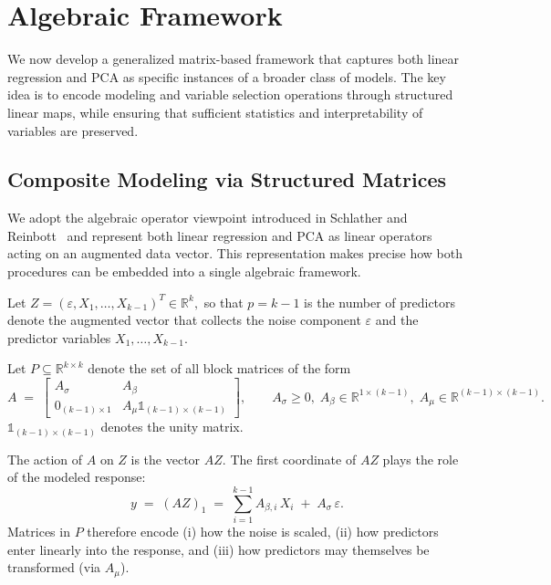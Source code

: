 \section{Algebraic Framework}


We now develop a generalized matrix-based framework that captures both linear regression and PCA as specific instances of a broader class of models. The key idea is to encode modeling and variable selection operations through structured linear maps, while ensuring that sufficient statistics and interpretability of variables are preserved.

\subsection{Composite Modeling via Structured Matrices}
\label{subsec:operator-formulation} 

We adopt the algebraic operator viewpoint introduced in Schlather and Reinbott~\cite{reinbott2021} and represent both linear regression and PCA as linear operators acting on an augmented data vector. This representation makes precise how both procedures can be embedded into a single algebraic framework.

Let $Z = ( \varepsilon, X_1, \dots, X_{k-1} )^T \in \mathbb{R}^k,$ so that $p=k-1$ is the number of predictors denote the augmented vector that collects the noise component \(\varepsilon\) and the predictor variables \(X_1,\dots,X_{k-1}\).

\begin{defn} Let \(P \subseteq \mathbb{R}^{k\times k}\) denote the set of all block matrices of the form
\begin{equation} \label{eq:block-A}
A \;=\;
\begin{bmatrix}
A_\sigma & A_\beta \\[4pt]
0_{(k-1)\times 1} & A_\mu\mathbb{1}_{(k-1)\times(k-1)}
\end{bmatrix},
\qquad
A_\sigma \geq 0,\;
A_\beta \in \mathbb{R}^{1\times (k-1)},\;
A_\mu \in \mathbb{R}^{(k-1)\times(k-1)}.
\end{equation}
$\mathbb{1}_{(k-1)\times(k-1)}$ denotes the unity matrix. 

The action of \(A\) on \(Z\) is the vector \(AZ\). The first coordinate of \(AZ\) plays the role of the modeled response:
\begin{equation} \label{eq:response}
y \;=\; (AZ)_{1}
\;=\; \sum_{i=1}^{k-1} A_{\beta,i}\, X_i \;+\; A_\sigma\,\varepsilon.
\end{equation}
Matrices in \(P\) therefore encode (i) how the noise is scaled, (ii) how predictors enter linearly into the response, and (iii) how predictors may themselves be transformed (via \(A_\mu\)).
\end{defn}

